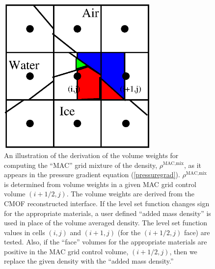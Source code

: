 \documentclass[]{article}
\begin{document}
\begin{figure}[htbp] 
  \centering
    \includegraphics[width=0.7\textwidth]{denMAC_mixture.eps}
  \caption{
   An illustration of the derivation of the volume weights for
   computing the 
   ``MAC'' grid 
   mixture of the density, $\rho^{\mbox{MAC,mix}}$, 
   as it appears 
   in the pressure gradient 
   equation (\ref{pressuregrad}).
   $\rho^{\mbox{MAC,mix}}$ 
   is determined from volume weights in a 
   given MAC grid control volume $(i+1/2,j)$.  The
   volume weights are derived from the CMOF
   reconstructed interface.
   If the level set
   function changes sign for the appropriate materials, a 
   user defined ``added mass density'' is used in place of the
   volume averaged density.  The level set function values in 
   cells $(i,j)$ and $(i+1,j)$ (for the $(i+1/2,j)$ face)
   are tested.  Also, if the 
   ``face'' volumes for the appropriate 
   materials are positive in the MAC grid 
   control volume, $(i+1/2,j)$,
   then we replace the given density
   with the ``added mass density.''
   }
  \label{denMAC_mixture} 
\end{figure}
\end{document}
